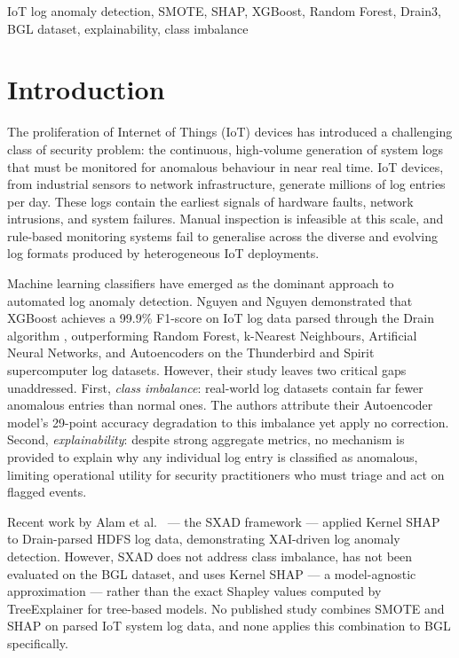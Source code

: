 \documentclass[conference]{IEEEtran}
\begin{document}
\begin{IEEEkeywords}
IoT log anomaly detection, SMOTE, SHAP, XGBoost, Random Forest,
Drain3, BGL dataset, explainability, class imbalance
\end{IEEEkeywords}

\section{Introduction}
\label{sec:intro}

The proliferation of Internet of Things (IoT) devices has introduced a
challenging class of security problem: the continuous, high-volume generation
of system logs that must be monitored for anomalous behaviour in near real
time. IoT devices, from industrial sensors to network infrastructure, generate
millions of log entries per day. These logs contain the earliest signals of
hardware faults, network intrusions, and system failures. Manual inspection is
infeasible at this scale, and rule-based monitoring systems fail to generalise
across the diverse and evolving log formats produced by heterogeneous IoT
deployments.

Machine learning classifiers have emerged as the dominant approach to
automated log anomaly detection. Nguyen and Nguyen \cite{nguyen2023}
demonstrated that XGBoost achieves a 99.9\% F1-score on IoT log data parsed
through the Drain algorithm \cite{he2017drain}, outperforming Random Forest,
k-Nearest Neighbours, Artificial Neural Networks, and Autoencoders on the
Thunderbird and Spirit supercomputer log datasets. However, their study leaves
two critical gaps unaddressed. First, \textit{class imbalance}: real-world log
datasets contain far fewer anomalous entries than normal ones. The authors
attribute their Autoencoder model's 29-point accuracy degradation to this
imbalance yet apply no correction. Second, \textit{explainability}: despite
strong aggregate metrics, no mechanism is provided to explain why any
individual log entry is classified as anomalous, limiting operational utility
for security practitioners who must triage and act on flagged events.

Recent work by Alam et al.\ \cite{alam2024sxad} --- the SXAD framework ---
applied Kernel SHAP to Drain-parsed HDFS log data, demonstrating XAI-driven
log anomaly detection. However, SXAD does not address class imbalance, has
not been evaluated on the BGL dataset, and uses Kernel SHAP --- a
model-agnostic approximation --- rather than the exact Shapley values
computed by TreeExplainer for tree-based models. No published study combines
SMOTE and SHAP on parsed IoT system log data, and none applies this
combination to BGL specifically.
\end{document}
